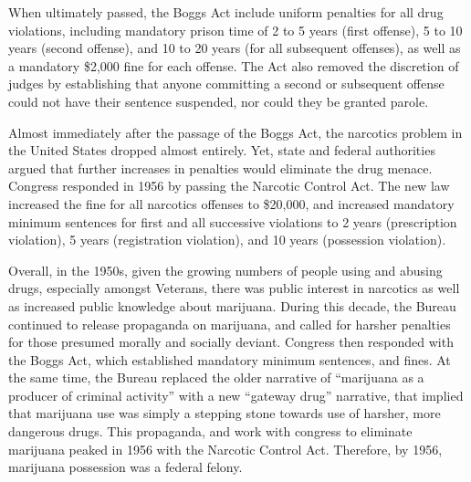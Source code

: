 \begin{quotation}
\begin{singlespace}
\end{singlespace}
\end{quotation}


When ultimately passed, the Boggs Act include uniform penalties for all drug violations, including mandatory prison time of 2 to 5 years (first offense), 5 to 10 years (second offense), and 10 to 20 years (for all subsequent offenses), as well as a mandatory \$2,000 fine for each offense. The Act also removed the discretion of judges by establishing that anyone committing a second or subsequent offense could not have their sentence suspended, nor could they be granted parole. 

Almost immediately after the passage of the Boggs Act, the narcotics problem in the United States dropped almost entirely. Yet, state and federal authorities argued that further increases in penalties would eliminate the drug menace. Congress responded in 1956 by passing the Narcotic Control Act. The new law increased the fine for all narcotics offenses to \$20,000, and increased mandatory minimum sentences for first and all successive violations to 2 years (prescription violation), 5 years (registration violation), and 10 years (possession violation). 


Overall, in the 1950s, given the growing numbers of people using and abusing drugs, especially amongst Veterans, there was public interest in narcotics as well as increased public knowledge about marijuana. During this decade, the Bureau continued to release propaganda on marijuana, and called for harsher penalties for those presumed morally and socially deviant. Congress then responded with the Boggs Act, which established mandatory minimum sentences, and fines. At the same time, the Bureau replaced the older narrative of ``marijuana as a producer of criminal activity'' with a new ``gateway drug'' narrative, that implied that marijuana use was simply a stepping stone towards use of harsher, more dangerous drugs. This propaganda, and work with congress to eliminate marijuana peaked in 1956 with the Narcotic Control Act. Therefore, by 1956, marijuana possession was a federal felony. 


